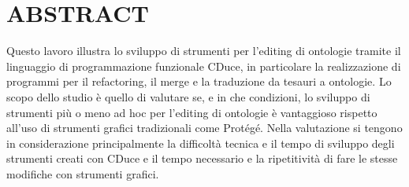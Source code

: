 \chapter*{ABSTRACT}
\vspace{1cm}
Questo lavoro illustra lo sviluppo di strumenti per l’editing di ontologie tramite il linguaggio di programmazione funzionale CDuce, in particolare la realizzazione di programmi per il refactoring, il merge e la traduzione da tesauri a ontologie. Lo scopo dello studio è quello di valutare se, e in che condizioni, lo sviluppo di strumenti più o meno ad hoc per l’editing di ontologie è vantaggioso rispetto all’uso di strumenti grafici tradizionali come Protégé. Nella valutazione si tengono in considerazione principalmente la difficoltà tecnica e il tempo di sviluppo degli strumenti creati con CDuce e il tempo necessario e la ripetitività di fare le stesse modifiche con strumenti grafici.